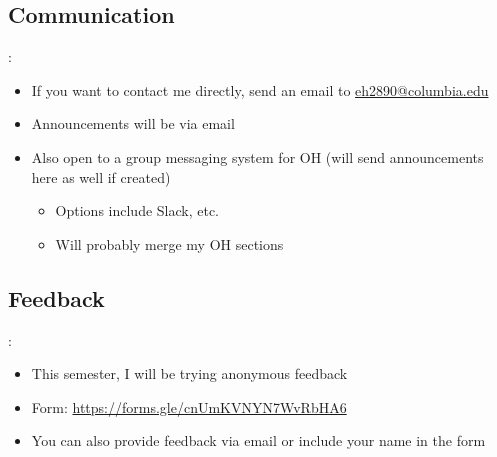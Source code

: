 \documentclass{../slides}
\begin{document}
\subsection{Communication}
\begin{frame}{\secname: \subsecname}
    \begin{itemize}
        \item If you want to contact me directly, send an email to \href{mailto:eh2890@columbia.edu}{eh2890@columbia.edu}
        \item Announcements will be via email
        \item Also open to a group messaging system for OH (will send announcements here as well if created)
        \begin{itemize}
            \item Options include Slack, etc.
            \item Will probably merge my OH sections
        \end{itemize}
    \end{itemize}
\end{frame}

\subsection{Feedback}
\begin{frame}{\secname: \subsecname}
    \begin{itemize}
        \item This semester, I will be trying anonymous feedback
        \item Form: \url{https://forms.gle/cnUmKVNYN7WvRbHA6}
        \item You can also provide feedback via email or include your name in the form
    \end{itemize}
\end{frame}
\end{document}
